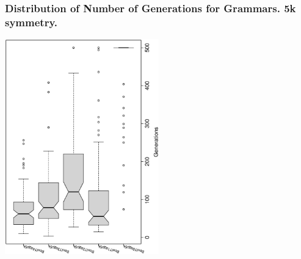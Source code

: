  \begin{frame}
 \frametitle{ Distribution of Number of Generations for Grammars. 5k  symmetry. }
 \begin{center}
\includegraphics[width=0.5\textwidth, angle=-90]
{ExpBboxplottGenerations003.eps}
 \end{center}
 \label{ExpBboxplottGenerations003.eps}  
 \end{frame}

